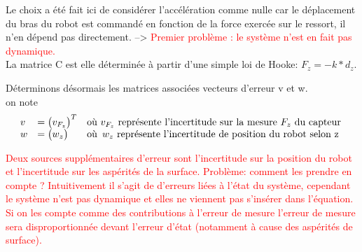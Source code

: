 \documentclass[12pt,twoside,a4paper]{article}
\begin{document}
Le choix a été fait ici de considérer l'accélération comme nulle car le déplacement du bras du robot est commandé en fonction de la force exercée sur le ressort, il n'en dépend pas directement. --> \textcolor{red}{Premier problème : le système n'est en fait pas dynamique.}
\\
La matrice C est elle déterminée à partir d'une simple loi de Hooke: $F_z = -k*d_z$.

\vspace{2cm}

Déterminons désormais les  matrices associées vecteurs d'erreur v et w. \\
on note
$$
\begin{array}{lll}
 v &= \begin{pmatrix}  v_{F_{z}}  \end{pmatrix} ^T  & \text{où $v_{F_{z}}$ représente l'incertitude sur la mesure $F_z$ du capteur} \\
 w &= \begin{pmatrix} w_z  \end{pmatrix}&
 		\text{où}
		\begin{array}[t]{l}
		\text{$w_z$ représente l'incertitude de position du robot selon z} \\
		\end{array} \\
 \end{array}
 $$

%

\textcolor{red}{Deux sources supplémentaires d'erreur sont l'incertitude sur la position du robot et l'incertitude sur les aspérités de la surface. Problème: comment les prendre en compte ? Intuitivement il s'agit de d'erreurs liées à l'état du système, cependant le système n'est pas dynamique et elles ne viennent pas s'insérer dans l'équation. Si on les compte comme des contributions à l'erreur de mesure l'erreur de mesure sera disproportionnée devant l'erreur d'état (notamment à cause des aspérités de surface). }
\end{document}
